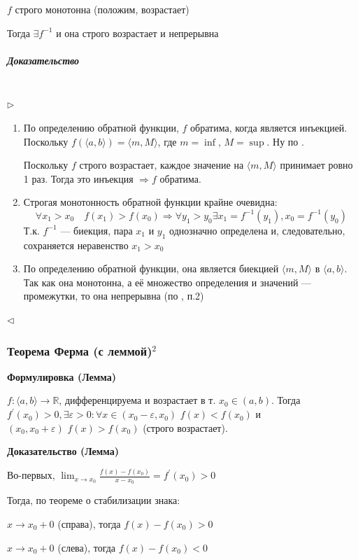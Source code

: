 \documentclass{article}
\def\dbl{\,\,}
\let\vanillasubparagraph\subparagraph
\renewcommand{\subparagraph}[1]{\vanillasubparagraph{#1}\mbox{}\\}
\begin{document}
$f$ строго монотонна (положим, возрастает)

Тогда $\exists f^{-1}$ и она строго возрастает и непрерывна

\subparagraph{Доказательство}
$\rhd$
\begin{enumerate}
\item
По определению обратной функции, $f$ обратима, когда является инъекцией. Поскольку $f(\langle a, b \rangle) = \langle m, M \rangle$, где $m = \inf$, $M = \sup$. Ну по .

Поскольку $f$ строго возрастает, каждое значение на $\langle m, M \rangle$ принимает ровно 1 раз. Тогда это инъекция $\Rightarrow f$ обратима.

\item
Строгая монотонность обратной функции крайне очевидна:
$$
\forall x_1 > x_0 \quad f(x_1) > f(x_0) \Rightarrow \forall y_1 > y_0 \exists x_1 = f^{-1}(y_1), x_0 = f^{-1}(y_0)
$$
Т.к. $f^{-1}$ --- биекция, пара $x_1$ и $y_1$ однозначно определена и, следовательно, сохраняется неравенство $x_1 > x_0$

\item
По определению обратной функции, она является биекцией $\langle m, M\rangle$ в $\langle a, b \rangle$. Так как она монотонна, а её множество определения и значений --- промежутки, то она непрерывна (по , п.2) 
\end{enumerate}
$\lhd$


\subsubsection{Теорема Ферма (с леммой)\texorpdfstring{$^2$}{}}

\textbf{Формулировка (Лемма)}

$f: \langle a, b \rangle \rightarrow \mathbb{R}$, дифференцируема и возрастает в т. $x_0 \in (a, b)$. Тогда $f^\prime(x_0) > 0, \exists \varepsilon > 0 : \forall x \in (x_0 - \varepsilon, x_0) \dbl f(x) < f(x_0)$ и $(x_0, x_0 + \varepsilon) \dbl f(x) > f(x_0)$ (строго возрастает).


\textbf{Доказательство (Лемма)}

Во-первых, $\lim_{x \rightarrow x_0}{\frac{f(x) - f(x_0)}{x - x_0}} = f^\prime(x_0) > 0$

Тогда, по теореме о стабилизации знака:

$x \rightarrow x_0 + 0$ (справа), тогда $f(x) - f(x_0) > 0$

$x \rightarrow x_0 + 0$ (слева), тогда $f(x) - f(x_0) < 0$
\end{document}
